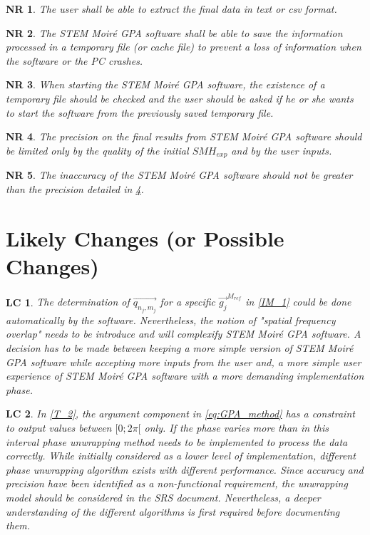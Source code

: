 \documentclass[12pt]{article}
\newcommand{\progname}{STEM Moir{\'e} GPA}
\newtheorem{NR}{NR}
\newtheorem{LC}{LC}
\begin{document}
\begin{NR}
\label{NR_5} 
\normalfont The user shall be able to extract the final data in text or csv format.
\end{NR}

\begin{NR}
\label{NR_6} 
\normalfont The \progname{} software shall be able to save the information processed in a temporary file (or cache file) to prevent a loss of information when the software or the PC crashes.
\end{NR}

\begin{NR}
\label{NR_7} 
\normalfont When starting the \progname{} software, the existence of a temporary file should be checked and the user should be asked if he or she wants to start the software from the previously saved temporary file.
\end{NR}

\begin{NR}
\label{NR_8} 
\normalfont The precision on the final results from \progname{} software should be limited only by the quality of the initial $SMH_{exp}$ and by the user inputs.
\end{NR}

\begin{NR}
\label{NR_9} 
\normalfont The inaccuracy of the \progname{} software should not be greater than the precision detailed in \cref{NR_8}.
\end{NR}


\section{Likely Changes (or Possible Changes)}    

\begin{LC}
\label{LC_1}
\normalfont The determination of $\overrightarrow{q_{n_j,m_j}}$ for a specific $\overrightarrow{g_j}^{M_{ref}}$ in \cref{IM_1} could be done automatically by the software. Nevertheless, the notion of "spatial frequency overlap" needs to be introduce and will complexify \progname{} software. A decision has to be made between keeping a more simple version of \progname{} software while accepting more inputs from the user and, a more simple user experience of \progname{} software with a more demanding implementation phase.
\end{LC}

\begin{LC}
\label{LC_2}
\normalfont In \cref{T_2}, the argument component in \cref{eq:GPA_method} has a constraint to output values between $[0;2\pi[$ only. If the phase varies more than in this interval phase unwrapping method needs to be implemented to process the data correctly. While initially considered as a lower level of implementation, different phase unwrapping algorithm exists with different performance. Since accuracy and precision have been identified as a non-functional requirement, the unwrapping model should be considered in the SRS document. Nevertheless, a deeper understanding of the different algorithms is first required before documenting them.
\end{LC}
\end{document}
